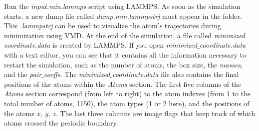 \documentclass[9pt,tutorial]{livecoms}
\begin{document}
Run the \textit{input.min.lammps} script using LAMMPS. As soon as the simulation starts, a new dump file called \textit{dump.min.lammpstrj} must appear in the folder. This \textit{.lammpstrj} can be used to visualize the atom's trajectories during minimization using VMD. At the end of the simulation, a file called \textit{minimized$\_$coordinate.data} is created by LAMMPS. If you open \textit{minimized$\_$coordinate.data} with a text editor, you can see that it contains all the information necessary to restart the simulation, such as the number of atoms, the box size, the \textit{masses}, and the \textit{pair$\_$coeffs}.
The \textit{minimized$\_$coordinate.data} file also contains the final positions of the atoms within the \textit{Atoms} section. The first five columns of the \textit{Atoms} section correspond (from left to right) to the atom indexes (from 1 to the total number of atoms, 1150), the atom types (1 or 2 here), and the positions of the atoms $x$, $y$, $z$. The last three columns are image flags that keep track of which atoms crossed the periodic boundary.
\end{document}
